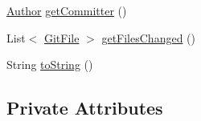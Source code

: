 \begin{DoxyCompactItemize}
\item 
\hyperlink{classcom_1_1selesse_1_1gitwrapper_1_1myobjects_1_1_author}{Author} \hyperlink{classcom_1_1selesse_1_1gitwrapper_1_1myobjects_1_1_commit_a6fead7b1978e17714faed780422e3e2f}{get\+Committer} ()
\item 
List$<$ \hyperlink{classcom_1_1selesse_1_1gitwrapper_1_1myobjects_1_1_git_file}{Git\+File} $>$ \hyperlink{classcom_1_1selesse_1_1gitwrapper_1_1myobjects_1_1_commit_a8e5918c57c058849abcf750ae7f3c7b6}{get\+Files\+Changed} ()
\item 
String \hyperlink{classcom_1_1selesse_1_1gitwrapper_1_1myobjects_1_1_commit_abc2e5a057294c1d04c0d5329b299ba77}{to\+String} ()
\end{DoxyCompactItemize}
\subsection*{Private Attributes}

